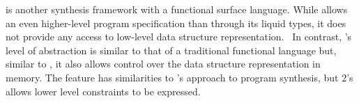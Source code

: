  is another synthesis framework with a functional
surface language. While  allows an even higher-level
program specification than \tool through its liquid types, it does not
provide any access to low-level data structure
representation.~\cite{polikarpova:2016:synquid} In contrast, \tool's
level of abstraction is similar to that of a traditional functional
language but, similar to , it also allows control over
the data structure representation in memory. The \synth{} feature
has similarities to 's approach to program synthesis, but
\Pika{} 2's \synth{} allows lower level constraints to be expressed.


